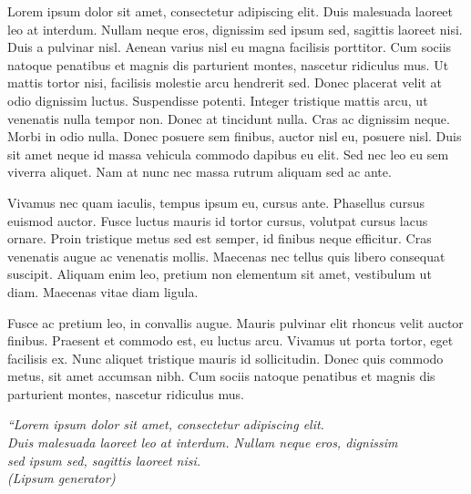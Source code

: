 \documentclass[
	12pt,				%
	openright,			%
	oneside,			%
	a4paper,			%
	english,			%
	french,				%
	spanish,			%
	brazil				%
	]{abntex2}
\begin{document}
\begin{agradecimentos}
Lorem ipsum dolor sit amet, consectetur adipiscing elit. Duis malesuada laoreet leo at interdum. Nullam neque eros, dignissim sed ipsum sed, sagittis laoreet nisi. Duis a pulvinar nisl. Aenean varius nisl eu magna facilisis porttitor. Cum sociis natoque penatibus et magnis dis parturient montes, nascetur ridiculus mus. Ut mattis tortor nisi, facilisis molestie arcu hendrerit sed. Donec placerat velit at odio dignissim luctus. Suspendisse potenti. Integer tristique mattis arcu, ut venenatis nulla tempor non. Donec at tincidunt nulla. Cras ac dignissim neque. Morbi in odio nulla. Donec posuere sem finibus, auctor nisl eu, posuere nisl. Duis sit amet neque id massa vehicula commodo dapibus eu elit. Sed nec leo eu sem viverra aliquet. Nam at nunc nec massa rutrum aliquam sed ac ante.

Vivamus nec quam iaculis, tempus ipsum eu, cursus ante. Phasellus cursus euismod auctor. Fusce luctus mauris id tortor cursus, volutpat cursus lacus ornare. Proin tristique metus sed est semper, id finibus neque efficitur. Cras venenatis augue ac venenatis mollis. Maecenas nec tellus quis libero consequat suscipit. Aliquam enim leo, pretium non elementum sit amet, vestibulum ut diam. Maecenas vitae diam ligula.

Fusce ac pretium leo, in convallis augue. Mauris pulvinar elit rhoncus velit auctor finibus. Praesent et commodo est, eu luctus arcu. Vivamus ut porta tortor, eget facilisis ex. Nunc aliquet tristique mauris id sollicitudin. Donec quis commodo metus, sit amet accumsan nibh. Cum sociis natoque penatibus et magnis dis parturient montes, nascetur ridiculus mus.
\end{agradecimentos}


\begin{epigrafe}
    \vspace*{\fill}
	\begin{flushright}
		\textit{``Lorem ipsum dolor sit amet, consectetur adipiscing elit. \\
		Duis malesuada laoreet leo at interdum. Nullam neque eros, dignissim \\
		sed ipsum sed, sagittis laoreet nisi.\\
		(Lipsum generator)}
	\end{flushright}
\end{epigrafe}
\end{document}
